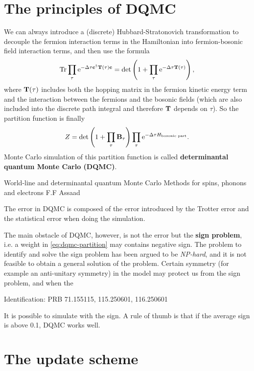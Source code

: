 \documentclass[hyperref, a4paper]{article}
\newcommand*{\ee}{\mathrm{e}}
\newcommand*{\concept}[1]{{\textbf{#1}}}
\begin{document}
\section{The principles of DQMC}

We can always introduce a (discrete) Hubbard-Stratonovich transformation to decouple the fermion interaction terms in the Hamiltonian into fermion-bosonic field interaction terms, and then use the formula 
\begin{equation}
    \Trace \prod_\tau \ee^{- \Delta \tau \vb{c}^\dagger \vb{T}(\tau) \vb{c}} = \det\left( 1 + \prod_\tau \ee^{- \Delta \tau \vb{T}(\tau)} \right) ,
\end{equation}
where $\vb{T}(\tau)$ includes both the hopping matrix in the fermion kinetic energy term and the interaction between the fermions and the bosonic fields (which are also included into the discrete path integral and therefore $\vb{T}$ depends on $\tau$).
So the partition function is finally 
\begin{equation}
    Z = \det \left( 1 + \prod_\tau \vb{B}_\tau \right) \prod_\tau \ee^{- \Delta \tau H_\text{bosonic part}}.
    \label{eq:dqmc-partition}
\end{equation}
Monte Carlo simulation of this partition function is called \concept{determinantal quantum Monte Carlo (DQMC)}.

World-line and determinantal quantum Monte Carlo Methods for spins, phonons and electrons F.F Assaad

The error in DQMC is composed of the error introduced by the Trotter error and the statistical error when doing the simulation.

The main obstacle of DQMC, however, is not the error but the \concept{sign problem}, i.e. a weight in \eqref{eq:dqmc-partition} may contains negative sign.
The problem to identify and solve the sign problem has been argued to be \emph{NP-hard}, and it is not feasible to obtain a general solution of the problem.
Certain symmetry (for example an anti-unitary symmetry) in the model may protect us from the sign problem, and when the 

Identification: PRB 71.155115, 115.250601, 116.250601

It is possible to simulate with the sign. A rule of thumb is that if the average sign is above 0.1, DQMC works well.

\section{The update scheme}
\end{document}
